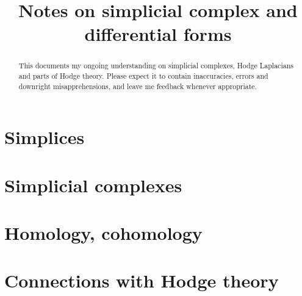 \documentclass{tufte-handout}
\title{Notes on simplicial complex and differential forms}
\author[Diego Navarro}
\date{}  %
\begin{document}
\maketitle%

\begin{abstract}
\noindent This documents my ongoing understanding on simplicial complexes, Hodge Laplacians and parts of Hodge theory. Please expect it to contain inaccuracies, errors and downright misapprehensions, and leave me feedback whenever appropriate. 
\end{abstract}

\section{Simplices}

\section{Simplicial complexes}

\section{Homology, cohomology}

\section{Connections with Hodge theory}
\nocite{*}


\end{document}
